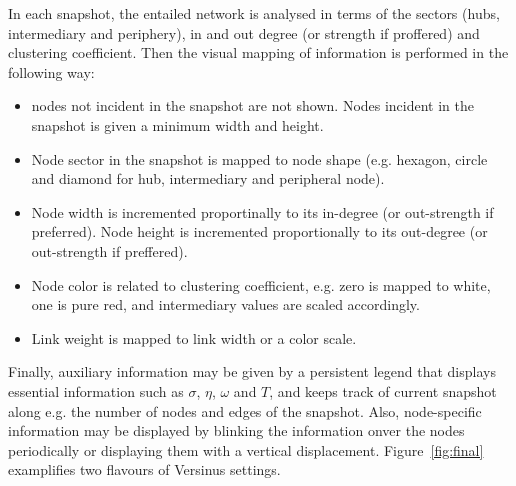 \documentclass[runningheads]{llncs}
\begin{document}
In each snapshot, the entailed network is analysed in terms of the sectors (hubs, intermediary and periphery), in and out degree (or strength if proffered) and clustering coefficient. Then the visual mapping of information is performed in the following way:
\begin{itemize}
  \item nodes not incident in the snapshot are not shown. Nodes incident in the snapshot is given a minimum width and height.
  \item Node sector in the snapshot is mapped to node shape (e.g. hexagon, circle and diamond for hub, intermediary and peripheral node).
  \item Node width is incremented proportinally to its in-degree (or out-strength if preferred). Node height is incremented proportionally to its out-degree (or out-strength if preffered).
  \item Node color is related to clustering coefficient, e.g. zero is mapped to white, one is pure red, and intermediary values are scaled accordingly.
  \item Link weight is mapped to link width or a color scale.
\end{itemize}

Finally, auxiliary information may be given by a persistent legend that displays essential information such as $\sigma$, $\eta$, $\omega$ and $T$, and keeps track of current snapshot along e.g. the number of nodes and edges of the snapshot.
Also, node-specific information may be displayed by blinking the information onver the nodes periodically or displaying them with a vertical displacement.
Figure~\ref{fig:final} examplifies two flavours of Versinus settings.
\end{document}
